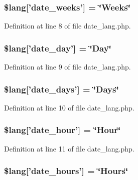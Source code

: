 \subsubsection[{\$lang}]{\setlength{\rightskip}{0pt plus 5cm}\$lang['date\-\_\-weeks'] = \char`\"{}Weeks\char`\"{}}\label{date__lang_8php_af09796515b005d759204f911305a8459}


Definition at line 8 of file date\-\_\-lang.\-php.

\subsubsection[{\$lang}]{\setlength{\rightskip}{0pt plus 5cm}\$lang['date\-\_\-day'] = \char`\"{}Day\char`\"{}}\label{date__lang_8php_ab414526293ffead872f9b90ed4fdd552}


Definition at line 9 of file date\-\_\-lang.\-php.

\subsubsection[{\$lang}]{\setlength{\rightskip}{0pt plus 5cm}\$lang['date\-\_\-days'] = \char`\"{}Days\char`\"{}}\label{date__lang_8php_abb37886fce0ac3f342d17f4132740870}


Definition at line 10 of file date\-\_\-lang.\-php.

\subsubsection[{\$lang}]{\setlength{\rightskip}{0pt plus 5cm}\$lang['date\-\_\-hour'] = \char`\"{}Hour\char`\"{}}\label{date__lang_8php_a7a4e78ef1f19291c5a7818cf08bfa3ca}


Definition at line 11 of file date\-\_\-lang.\-php.

\subsubsection[{\$lang}]{\setlength{\rightskip}{0pt plus 5cm}\$lang['date\-\_\-hours'] = \char`\"{}Hours\char`\"{}}\label{date__lang_8php_ad1fe07226d651882b9ecce9cb2011db2}


